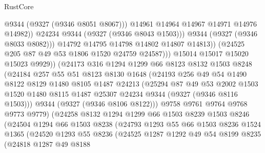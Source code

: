 \begin{lexlean}{RustCore}
\begin{coremodule}
                              @9344
                              (@9327 (@9346 @8051 @8067)))
                            @14961
                            @14964
                            @14967
                            @14971
                            @14976
                            @14982))
                        @24234
                        @9344
                        (@9327 (@9346 @8043 @1503)))
                      @9344
                      (@9327 (@9346 @8033 @8082)))
                    @14792
                    @14795
                    @14798
                    @14802
                    @14807
                    @14813))
                (@24525 @205 @87 @49 @53 @1806 @1520 @24759 @24587)))
            @15014
            @15017
            @15020
            @15023
            @9929))
        (@24173
          @316
          @1294
          @1299
          @66
          @8123
          @8132
          @1503
          @8248
          (@24184
            @257
            @55
            @51
            @8123
            @8130
            @1648
            (@24193
              @256
              @49
              @54
              @1490
              @8122
              @8129
              @1480
              @8105
              @1487
              @24213
              (@25294
                @87
                @49
                @53
                @2002
                @1503
                @1520
                @1480
                @8115
                @1487
                @25307
                @24234
                @9344
                (@9327 (@9346 @8116 @1503)))
              @9344
              (@9327 (@9346 @8106 @8122)))
            @9758
            @9761
            @9764
            @9768
            @9773
            @9779)
          (@24258
            @8132
            @1294
            @1299
            @66
            @1503
            @8239
            @1503
            @8246
            (@24504
              @1294
              @66
              @1503
              @8238
              (@24793
                @1293
                @55
                @66
                @1503
                @8236
                @1524
                @1365
                (@24520
                  @1293
                  @55
                  @8236
                  (@24525
                    @1287
                    @1292
                    @49
                    @54
                    @8199
                    @8235
                    (@24818
                      @1287
                      @49
                      @8188

\end{coremodule}
\end{lexlean}
